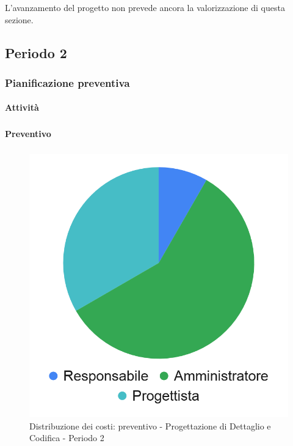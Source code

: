 L'avanzamento del progetto non prevede ancora la valorizzazione di questa sezione.


\pagebreak
\subsection{Periodo 2}

\subsubsection{Pianificazione preventiva}

\paragraph{Attività}
\subparagraph*{}

\planningTable{
	
}

\paragraph{Preventivo}
\subparagraph*{}

\hspace{-1cm}
\begin{minipage}{.50\textwidth}
\smallPreventivoTable{
	
}
\end{minipage}
\hspace{1cm}
\begin{minipage}{.40\textwidth}
\begin{figure}[H]
	\includegraphics[scale=0.21]{res/images/charts/preventivo_priori/Grafico4-7.png}
	\caption{Distribuzione dei costi: preventivo - Progettazione di Dettaglio e Codifica - Periodo 2}
\end{figure}
\end{minipage} 



